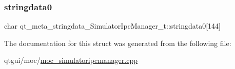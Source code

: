 \subsubsection{\texorpdfstring{stringdata0}{stringdata0}}
{\footnotesize\ttfamily char qt\+\_\+meta\+\_\+stringdata\+\_\+\+Simulator\+Ipc\+Manager\+\_\+t\+::stringdata0\mbox{[}144\mbox{]}}



The documentation for this struct was generated from the following file\+:\begin{DoxyCompactItemize}
\item 
qtgui/moc/\mbox{\hyperlink{moc__simulatoripcmanager_8cpp}{moc\+\_\+simulatoripcmanager.\+cpp}}\end{DoxyCompactItemize}
